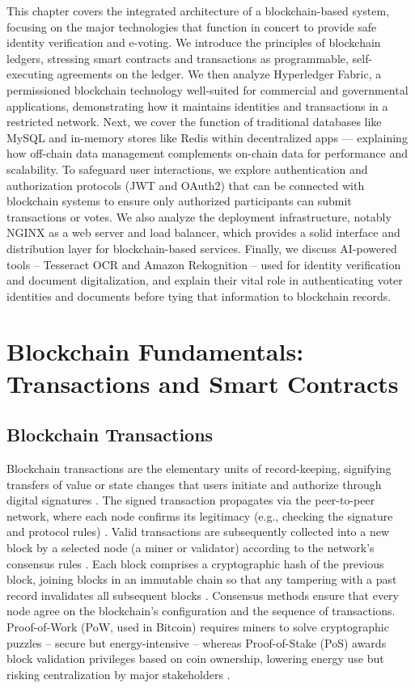 \documentclass[a4paper,10pt]{report}
\begin{document}
 This chapter covers the integrated architecture of a blockchain-based system, focusing on the major technologies that function in concert to provide safe identity verification and e-voting.  We introduce the principles of blockchain ledgers, stressing smart contracts and transactions as programmable, self-executing agreements on the ledger.  We then analyze Hyperledger Fabric, a permissioned blockchain technology well-suited for commercial and governmental applications, demonstrating how it maintains identities and transactions in a restricted network.  Next, we cover the function of traditional databases like MySQL and in-memory stores like Redis within decentralized apps — explaining how off-chain data management complements on-chain data for performance and scalability.  To safeguard user interactions, we explore authentication and authorization protocols (JWT and OAuth2) that can be connected with blockchain systems to ensure only authorized participants can submit transactions or votes.  We also analyze the deployment infrastructure, notably NGINX as a web server and load balancer, which provides a solid interface and distribution layer for blockchain-based services.  Finally, we discuss AI-powered tools – Tesseract OCR and Amazon Rekognition – used for identity verification and document digitalization, and explain their vital role in authenticating voter identities and documents before tying that information to blockchain records.

\section{Blockchain Fundamentals: Transactions and Smart Contracts}
\subsection{Blockchain Transactions}
Blockchain transactions are the elementary units of record-keeping, signifying transfers of value or state changes that users initiate and authorize through digital signatures \cite{yaga2018nist}. The signed transaction propagates via the peer-to-peer network, where each node confirms its legitimacy (e.g., checking the signature and protocol rules) \cite{christidis2016iot}. Valid transactions are subsequently collected into a new block by a selected node (a miner or validator) according to the network’s consensus rules \cite{christidis2016iot}. Each block comprises a cryptographic hash of the previous block, joining blocks in an immutable chain so that any tampering with a past record invalidates all subsequent blocks \cite{yaga2018nist}. Consensus methods ensure that every node agree on the blockchain’s configuration and the sequence of transactions. Proof-of-Work (PoW, used in Bitcoin) requires miners to solve cryptographic puzzles – secure but energy-intensive – whereas Proof-of-Stake (PoS) awards block validation privileges based on coin ownership, lowering energy use but risking centralization by major stakeholders \cite{hussein2023consensus}.
\end{document}

